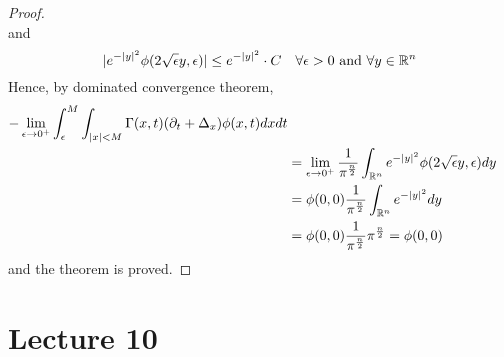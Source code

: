 \begin{ProofBox}
\begin{proof}
\begin{equation*}
        \end{equation*}
        and 
        \begin{equation*}
            |e^{-|y|^2} \phi(2 \sqrt{\epsilon}y, \epsilon)| \leq e^{-|y|^2} \cdot C \quad \forall \epsilon > 0 \text{ and } \forall y \in \mathbb{R}^n
        \end{equation*}
        Hence, by dominated convergence theorem,
        \begin{align*}
            -\lim_{\epsilon \rightarrow 0^+} \int_\epsilon^M \int_{|x| < M} \Gamma(x,t) (\partial_t + \Delta_x) \phi(x,t) dx dt \\
            &= \lim_{\epsilon \rightarrow 0^+} \frac{1}{\pi^\frac{n}{2}} \int_{\mathbb{R}^n} e^{-|y|^2}\phi(2 \sqrt{\epsilon}y,\epsilon) dy \\
            &= \phi(0,0) \frac{1}{\pi^\frac{n}{2}}\int_{\mathbb{R}^n} e^{-|y|^2} dy \\
            &= \phi(0,0) \frac{1}{\pi^\frac{n}{2}} \pi^\frac{n}{2} = \phi(0,0)
        \end{align*}
        and the theorem is proved. 
    \end{proof}
\end{ProofBox}
\section{Lecture 10}
